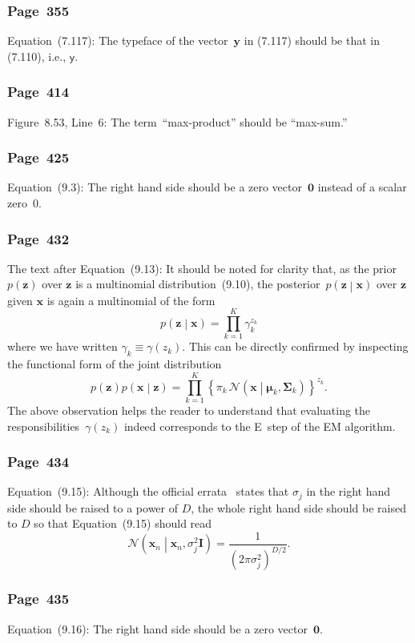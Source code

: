 \documentclass[12pt,a4paper]{article}
\newcommand{\erratum}[1]{\subsubsection*{#1}}
\begin{document}
\erratum{Page~355}
Equation~(7.117):
The typeface of the vector~$\mathbf{y}$ in (7.117) should be that in (7.110), i.e.,
$\bm{\mathsf{y}}$.

\erratum{Page~414}
Figure~8.53, Line~6:
The term~``max-product'' should be ``max-sum.''

\erratum{Page~425}
Equation~(9.3):
The right hand side should be a zero vector~$\mathbf{0}$ instead of a scalar zero~$0$.

\erratum{Page~432}
The text after Equation~(9.13):
It should be noted for clarity that, as the prior~$p(\mathbf{z})$ over $\mathbf{z}$ is
a multinomial distribution~(9.10),
the posterior~$p \left( \mathbf{z} \middle| \mathbf{x} \right)$ over $\mathbf{z}$
given $\mathbf{x}$ is again a multinomial of the form
\begin{equation}
p \left( \mathbf{z} \middle| \mathbf{x} \right) = \prod_{k=1}^{K} \gamma_k^{z_k}
\label{eq:posterior_of_Gaussian_mixture}
\end{equation}
where we have written $\gamma_k \equiv \gamma(z_k)$.
This can be directly confirmed by inspecting the functional form of the joint distribution
\begin{equation}
p \left( \mathbf{z} \right) p \left( \mathbf{x} \middle| \mathbf{z} \right) =
 \prod_{k=1}^{K} \left\{ \pi_k \,
 \mathcal{N} \left( \mathbf{x} \middle| \bm{\mu}_k, \bm{\Sigma}_k \right) \right\}^{z_k} .
\label{eq:joint_distribution_of_Gaussian_mixture}
\end{equation}
The above observation helps the reader to understand that
evaluating the responsibilities~$\gamma(z_k)$ indeed corresponds to
the E~step of the EM algorithm.

\erratum{Page~434}
Equation~(9.15):
Although the official errata~\citep{Svensen:PRML_errata} states that
$\sigma_j$ in the right hand side should be raised to a power of $D$,
the whole right hand side should be raised to $D$ so that Equation~(9.15) should read
\begin{equation}
\mathcal{N}\left( \mathbf{x}_n \middle| \mathbf{x}_n, \sigma_j^2 \mathbf{I} \right)
 = \frac{1}{\left( 2 \pi \sigma_j^2 \right)^{D/2}} .
\end{equation}

\erratum{Page~435}
Equation~(9.16):
The right hand side should be a zero vector~$\mathbf{0}$.
\end{document}
